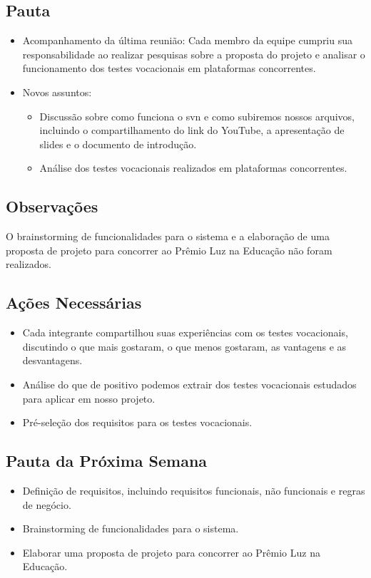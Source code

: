 \begin{apendicesenv}
\subsection*{Pauta}
\begin{itemize}
    \item Acompanhamento da última reunião: Cada membro da equipe cumpriu sua responsabilidade ao realizar pesquisas sobre a proposta do projeto e analisar o funcionamento dos testes vocacionais em plataformas concorrentes.
    \item Novos assuntos:
    \begin{itemize}
        \item Discussão sobre como funciona o \ac{svn} e como subiremos nossos arquivos, incluindo o compartilhamento do link do YouTube, a apresentação de slides e o documento de introdução.
        \item Análise dos testes vocacionais realizados em plataformas concorrentes.
    \end{itemize}
\end{itemize}

\subsection*{Observações}
O brainstorming de funcionalidades para o sistema e a elaboração de uma proposta de projeto para concorrer ao Prêmio Luz na Educação não foram realizados.

\subsection*{Ações Necessárias}
\begin{itemize}
    \item Cada integrante compartilhou suas experiências com os testes vocacionais, discutindo o que mais gostaram, o que menos gostaram, as vantagens e as desvantagens.
    \item Análise do que de positivo podemos extrair dos testes vocacionais estudados para aplicar em nosso projeto.
    \item Pré-seleção dos requisitos para os testes vocacionais.
\end{itemize}

\subsection*{Pauta da Próxima Semana}
\begin{itemize}
    \item Definição de requisitos, incluindo requisitos funcionais, não funcionais e regras de negócio.
    \item Brainstorming de funcionalidades para o sistema.
    \item Elaborar uma proposta de projeto para concorrer ao Prêmio Luz na Educação.
\end{itemize}


\end{apendicesenv}

